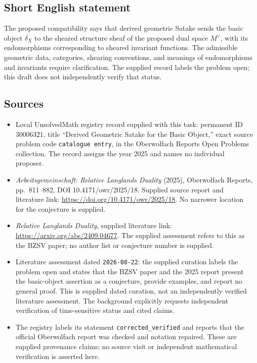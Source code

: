 \documentclass[11pt]{article}
\begin{document}
\subsection{Short English statement}
The proposed compatibility says that derived geometric Satake sends the basic object \(\delta_X\) to the sheared structure sheaf of the proposed dual space \(M^\vee\), with its endomorphisms corresponding to sheared invariant functions. The admissible geometric data, categories, shearing conventions, and meanings of endomorphisms and invariants require clarification. The supplied record labels the problem open; this draft does not independently verify that status.
\subsection{Sources}
\begin{itemize}
\item Local UnsolvedMath registry record supplied with this task: permanent ID \(30006321\), title ``Derived Geometric Satake for the Basic Object,'' exact source problem code \texttt{catalogue entry}, in the Oberwolfach Reports Open Problems collection. The record assigns the year 2025 and names no individual proposer.
\item \emph{Arbeitsgemeinschaft: Relative Langlands Duality} (2025), Oberwolfach Reports, pp.\ 811--882, DOI 10.4171/owr/2025/18. Supplied source report and literature link: \url{https://doi.org/10.4171/owr/2025/18}. No narrower location for the conjecture is supplied.
\item \emph{Relative Langlands Duality}, supplied literature link: \url{https://arxiv.org/abs/2409.04677}. The supplied assessment refers to this as the BZSV paper; no author list or conjecture number is supplied.
\item Literature assessment dated \texttt{2026-08-22}: the supplied curation labels the problem open and states that the BZSV paper and the 2025 report present the basic-object assertion as a conjecture, provide examples, and report no general proof. This is supplied dated curation, not an independently verified literature assessment. The background explicitly requests independent verification of time-sensitive status and cited claims.
\item The registry labels its statement \texttt{corrected\_verified} and reports that the official Oberwolfach report was checked and notation repaired. These are supplied provenance claims; no source visit or independent mathematical verification is asserted here.
\end{itemize}
\end{document}
